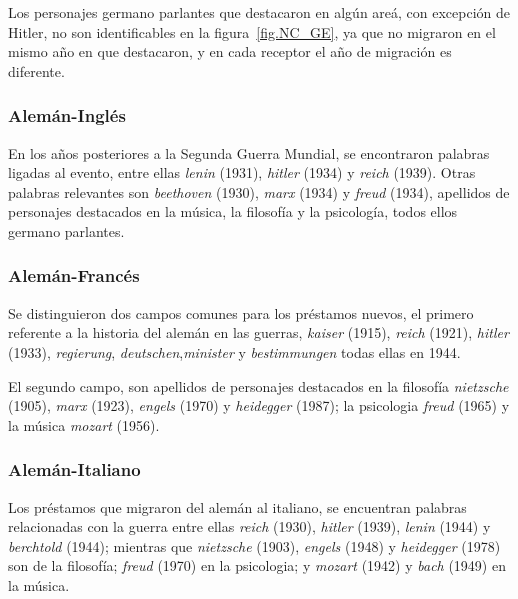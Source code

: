 Los personajes germano parlantes que destacaron en algún areá, con excepción de Hitler, no son identificables en la figura~\ref{fig.NC_GE}, ya que no migraron en el mismo año en que destacaron, y en cada receptor el año de migración es diferente. 


\subsubsection*{Alemán-Inglés}%

En los años posteriores a la Segunda Guerra Mundial, se encontraron palabras ligadas al evento, entre ellas \textit{lenin} (1931), \textit{hitler} (1934) y \textit{reich} (1939).  Otras palabras relevantes son \textit{beethoven} (1930), \textit{marx} (1934) y \textit{freud} (1934), apellidos de personajes destacados en la música, la filosofía y la psicología, todos ellos germano parlantes.


\subsubsection*{Alemán-Francés}%


Se distinguieron dos campos comunes para los préstamos nuevos,  el primero referente a la historia del alemán en las guerras, \textit{kaiser} (1915), \textit{reich} (1921), \textit{hitler} (1933),  \textit{regierung}, \textit{deutschen},\textit{minister} y  \textit{bestimmungen} todas ellas en 1944. %

El segundo campo, son apellidos de  personajes destacados en la filosofía \textit{nietzsche} (1905),  \textit{marx} (1923), \textit{engels} (1970) y \textit{heidegger} (1987); la psicologia \textit{freud} (1965)  y  la música \textit{mozart} (1956). 



\subsubsection*{Alemán-Italiano}%

Los préstamos que migraron del alemán al italiano,  se encuentran palabras relacionadas con la guerra  entre ellas \textit{reich} (1930),  \textit{hitler} (1939), \textit{lenin} (1944) y \textit{berchtold} (1944); mientras que 
\textit{nietzsche} (1903),  \textit{engels} (1948) y  \textit{heidegger} (1978) son de la filosofía; \textit{freud} (1970) en la psicologia; y \textit{mozart} (1942) y \textit{bach} (1949) en la música. 



